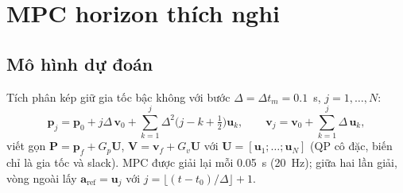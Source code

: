 \documentclass[11pt,a4paper]{article}
\numberwithin{equation}{section}
\newcommand{\vb}[1]{\bm{#1}}
\theoremstyle{definition}
\theoremstyle{plain}
\theoremstyle{remark}
\begin{document}
\section{MPC horizon thích nghi}
\label{sec:mpc}

\subsection{Mô hình dự đoán}
Tích phân kép giữ gia tốc bậc không với bước $\Delta=\Delta t_m=0.1$~s, $j=1,\dots,N$:
\begin{equation}
\vb p_j=\vb p_0+j\Delta\,\vb v_0+\sum_{k=1}^{j}\Delta^2\big(j-k+\tfrac12\big)\vb u_k,\qquad
\vb v_j=\vb v_0+\sum_{k=1}^{j}\Delta\,\vb u_k, \label{eq:pred}
\end{equation}
viết gọn $\mathbf P=\vb p_f+G_p\mathbf U$, $\mathbf V=\vb v_f+G_v\mathbf U$ với $\mathbf U=[\vb u_1;\dots;\vb u_N]$ (QP cô đặc, biến chỉ là gia tốc và slack). MPC được giải lại mỗi 0.05~s (20~Hz); giữa hai lần giải, vòng ngoài lấy $\vb a_{\text{ref}}=\vb u_j$ với $j=\lfloor(t-t_0)/\Delta\rfloor+1$.
\end{document}
